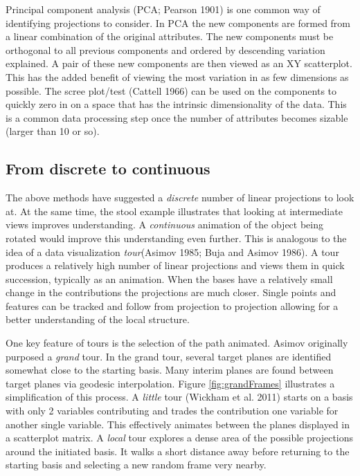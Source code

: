 \documentclass[
  11,
]{article}
\begin{document}
Principal component analysis (PCA; Pearson 1901) is one common way of identifying projections to consider. In PCA the new components are formed from a linear combination of the original attributes. The new components must be orthogonal to all previous components and ordered by descending variation explained. A pair of these new components are then viewed as an XY scatterplot. This has the added benefit of viewing the most variation in as few dimensions as possible. The scree plot/test (Cattell 1966) can be used on the components to quickly zero in on a space that has the intrinsic dimensionality of the data. This is a common data processing step once the number of attributes becomes sizable (larger than 10 or so).

\hypertarget{from-discrete-to-continuous}{%
\subsection{From discrete to continuous}\label{from-discrete-to-continuous}}

The above methods have suggested a \emph{discrete} number of linear projections to look at. At the same time, the stool example illustrates that looking at intermediate views improves understanding. A \emph{continuous} animation of the object being rotated would improve this understanding even further. This is analogous to the idea of a data visualization \emph{tour}(Asimov 1985; Buja and Asimov 1986). A tour produces a relatively high number of linear projections and views them in quick succession, typically as an animation. When the bases have a relatively small change in the contributions the projections are much closer. Single points and features can be tracked and follow from projection to projection allowing for a better understanding of the local structure.

One key feature of tours is the selection of the path animated.
Asimov originally purposed a \emph{grand} tour. In the grand tour, several target planes are identified somewhat close to the starting basis. Many interim planes are found between target planes via geodesic interpolation. Figure \ref{fig:grandFrames} illustrates a simplification of this process. A \emph{little} tour (Wickham et al. 2011) starts on a basis with only 2 variables contributing and trades the contribution one variable for another single variable. This effectively animates between the planes displayed in a scatterplot matrix. A \emph{local} tour explores a dense area of the possible projections around the initiated basis. It walks a short distance away before returning to the starting basis and selecting a new random frame very nearby.
\end{document}
